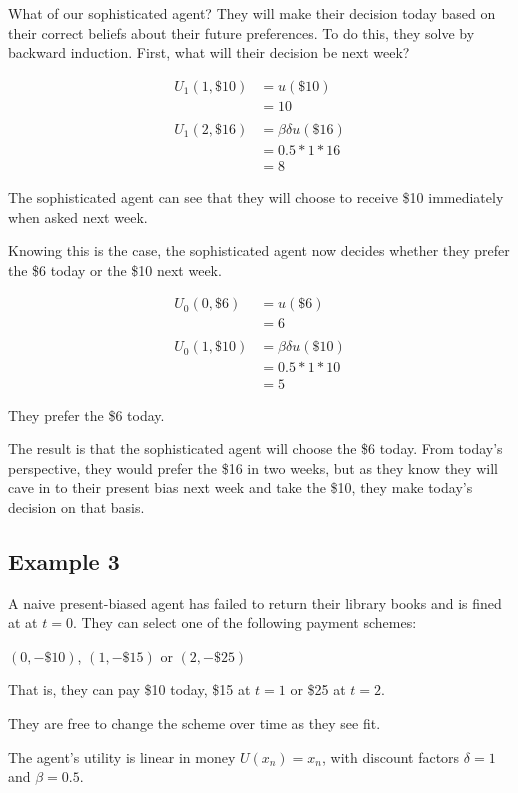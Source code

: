 \documentclass[
  letterpaper,
  DIV=11,
  numbers=noendperiod]{scrreprt}
\begin{document}
What of our sophisticated agent? They will make their decision today
based on their correct beliefs about their future preferences. To do
this, they solve by backward induction. First, what will their decision
be next week?

\begin{align*}
U_1(1,\$10)&=u(\$10) \\
&=10 \\
\\
U_1(2,\$16)&=\beta\delta u(\$16) \\
&=0.5*1*16 \\
&=8
\end{align*}

The sophisticated agent can see that they will choose to receive \$10
immediately when asked next week.

Knowing this is the case, the sophisticated agent now decides whether
they prefer the \$6 today or the \$10 next week.

\begin{align*}
U_0(0,\$6)&=u(\$6) \\
&=6 \\
\\
U_0(1,\$10)&=\beta\delta u(\$10) \\
&=0.5*1*10 \\
&=5
\end{align*}

They prefer the \$6 today.

The result is that the sophisticated agent will choose the \$6 today.
From today's perspective, they would prefer the \$16 in two weeks, but
as they know they will cave in to their present bias next week and take
the \$10, they make today's decision on that basis.

\hypertarget{example-3-2}{%
\subsection{Example 3}\label{example-3-2}}

A naive present-biased agent has failed to return their library books
and is fined at at \(t=0\). They can select one of the following payment
schemes:

\((0,-\$10)\), \((1,-\$15)\) or \((2,-\$25)\)

That is, they can pay \$10 today, \$15 at \(t=1\) or \$25 at \(t=2\).

They are free to change the scheme over time as they see fit.

The agent's utility is linear in money \(U(x_n)=x_n\), with discount
factors \(\delta=1\) and \(\beta=0.5\).
\end{document}
